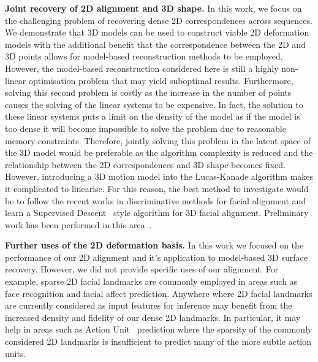 \textbf{Joint recovery of 2D alignment and 3D shape.}
In this work, we focus on the challenging problem of recovering dense 2D
correspondences across sequences. We demonstrate that 3D models can be used
to construct viable 2D deformation models with the additional benefit that the
correspondence between the 2D and 3D points allows for model-based
reconstruction methods to be employed. However, the model-based reconstruction
considered here is still a highly non-linear optimisation problem that may
yield suboptimal results. Furthermore, solving this second problem is costly
as the increase in the number of points causes the solving of the linear
systems to be expensive. In fact, the solution to these linear systems puts a 
limit on the density of the model as if the model is too dense it will become
impossible to solve the problem due to reasonable memory constraints. Therefore,
jointly solving this problem in the latent space of the 3D model would be
preferable as the algorithm complexity is reduced and the relationship between the
2D correspondences and 3D shape becomes fixed. However, introducing a 3D
motion model into the Lucas-Kanade algorithm makes it complicated to linearise.
For this reason, the best method to investigate would be to follow the recent
works in discriminative methods for facial alignment and learn a 
Supervised Descent~\cite{xiong2013supervised} style algorithm for 3D facial
alignment. Preliminary work has been performed in this 
area~\cite{thies2016face,Jourabloo:2015dw,Huber:2015bs,Jeni:2015ft,jo2015single}.

\textbf{Further uses of the 2D deformation basis.} In this work we focused
on the performance of our 2D alignment and it's application to model-based 3D
surface recovery. However, we did not provide specific uses of our alignment.
For example, sparse 2D facial landmarks are commonly employed in areas such as
face recognition and facial affect prediction. Anywhere where 2D facial landmarks
are currently considered as input features for inference may benefit from
the increased density and fidelity of our dense 2D landmarks. In particular,
it may help in areas such as Action Unit~\cite{ekman1977facial} prediction
where the sparsity of the commonly considered 2D landmarks is insufficient
to predict many of the more subtle action units.
